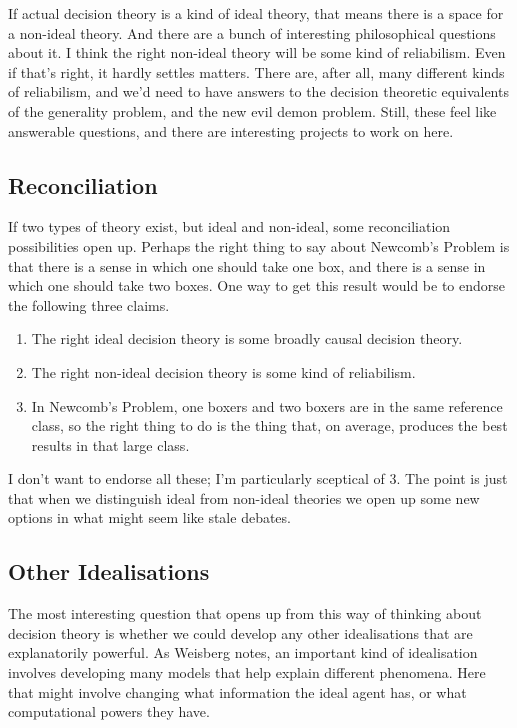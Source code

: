 \documentclass[
  10pt,
  letterpaper,
  DIV=11,
  numbers=noendperiod,
  twoside]{scrartcl}
\providecommand{\tightlist}{%
  \setlength{\itemsep}{0pt}\setlength{\parskip}{0pt}}\usepackage{longtable,booktabs,array}
\begin{document}
If actual decision theory is a kind of ideal theory, that means there is
a space for a non-ideal theory. And there are a bunch of interesting
philosophical questions about it. I think the right non-ideal theory
will be some kind of reliabilism. Even if that's right, it hardly
settles matters. There are, after all, many different kinds of
reliabilism, and we'd need to have answers to the decision theoretic
equivalents of the generality problem, and the new evil demon problem.
Still, these feel like answerable questions, and there are interesting
projects to work on here.

\subsection{Reconciliation}\label{reconciliation}

If two types of theory exist, but ideal and non-ideal, some
reconciliation possibilities open up. Perhaps the right thing to say
about Newcomb's Problem is that there is a sense in which one should
take one box, and there is a sense in which one should take two boxes.
One way to get this result would be to endorse the following three
claims.

\begin{enumerate}
\def\labelenumi{\arabic{enumi}.}
\tightlist
\item
  The right ideal decision theory is some broadly causal decision
  theory.
\item
  The right non-ideal decision theory is some kind of reliabilism.
\item
  In Newcomb's Problem, one boxers and two boxers are in the same
  reference class, so the right thing to do is the thing that, on
  average, produces the best results in that large class.
\end{enumerate}

I don't want to endorse all these; I'm particularly sceptical of 3. The
point is just that when we distinguish ideal from non-ideal theories we
open up some new options in what might seem like stale debates.

\subsection{Other Idealisations}\label{other-idealisations}

The most interesting question that opens up from this way of thinking
about decision theory is whether we could develop any other
idealisations that are explanatorily powerful. As Weisberg notes, an
important kind of idealisation involves developing many models that help
explain different phenomena. Here that might involve changing what
information the ideal agent has, or what computational powers they have.
\end{document}
